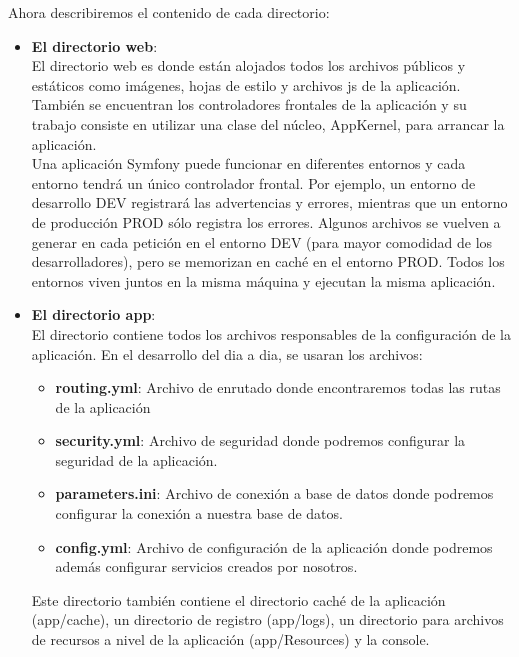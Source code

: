 Ahora describiremos el contenido de cada directorio:

\begin{itemize}
\item \textbf{El directorio web}: \\
El directorio web es donde están alojados todos los archivos públicos y estáticos como imágenes, hojas de estilo y archivos js de la aplicación. También se encuentran los controladores frontales de la aplicación y su trabajo consiste en utilizar una clase del núcleo, AppKernel, para arrancar la aplicación. \\
Una aplicación Symfony puede funcionar en diferentes entornos y cada entorno tendrá un único controlador frontal.
Por ejemplo, un entorno de desarrollo DEV registrará las advertencias y errores, mientras que un entorno de producción PROD sólo registra los errores. Algunos archivos se vuelven a generar en cada petición en el entorno DEV (para mayor comodidad de los desarrolladores), pero se memorizan en caché en el entorno PROD. Todos los entornos viven juntos en la misma máquina y ejecutan la misma aplicación.

\item \textbf{El directorio app}: \\
El directorio contiene todos los archivos responsables de la configuración de la aplicación.
En el desarrollo del dia a dia, se usaran los archivos:

\begin{itemize}
\item \textbf{routing.yml}: Archivo de enrutado donde encontraremos todas las rutas de la aplicación\\
\item \textbf{security.yml}: Archivo de seguridad donde podremos configurar la seguridad de la aplicación.\\
\item \textbf{parameters.ini}: Archivo de conexión a base de datos donde podremos configurar la conexión a nuestra base de datos.\\
\item \textbf{config.yml}: Archivo de configuración de la aplicación donde podremos además configurar servicios creados por nosotros.\\
\end{itemize}

Este directorio también contiene el directorio caché de la aplicación (app/cache), un directorio de registro (app/logs), un directorio para archivos de recursos a nivel de la aplicación (app/Resources) y la console.


\end{itemize}
